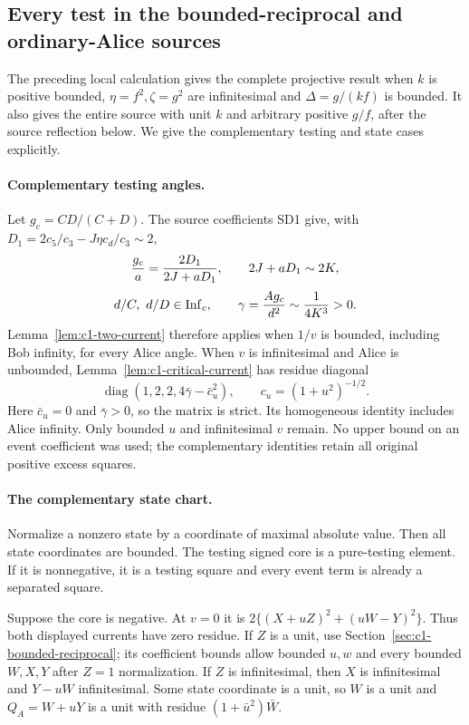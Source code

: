 \subsection{Every test in the bounded-reciprocal and ordinary-Alice sources}
\label{sec:c1-uniform-projective-join}
\label{component:p9f00f949fc8c}
\label{component:p64b054e815d0}
\label{component:p18a57c9c271d}
\label{component:p41b39e2f94e1}
\label{p41b39e2f94e1:thm:bounded-delta}
\label{p18a57c9c271d:thm:c1-ordinary-angle}

The preceding local calculation gives the complete projective result
when $k$ is positive bounded, $\eta=f^2,\zeta=g^2$ are infinitesimal
and $\Delta=g/(kf)$ is bounded. It also gives the entire source with
unit $k$ and arbitrary positive $g/f$, after the source reflection
below. We give the complementary testing and state cases explicitly.

\paragraph{Complementary testing angles.}
Let $g_c=CD/(C+D)$. The source coefficients SD1 give, with
$D_1=2c_5/c_3-J\eta c_d/c_3\sim2$,
\[
 {g_c\over a}={2D_1\over 2J+aD_1},\qquad
 2J+aD_1\sim2K,
\]
\[
 d/C,\ d/D\in\operatorname{Inf}_c,\qquad
 \gamma={Ag_c\over d^2}\sim{1\over4K^3}>0.
\]
Lemma~\ref{lem:c1-two-current} therefore applies when $1/v$ is bounded, including
Bob infinity, for every Alice angle. When $v$ is infinitesimal and
Alice is unbounded, Lemma~\ref{lem:c1-critical-current} has
residue diagonal
\[
 \operatorname{diag}(1,2,2,4\bar\gamma-\bar c_u^2),
 \qquad c_u=(1+u^2)^{-1/2}.
\]
Here $\bar c_u=0$ and $\bar\gamma>0$, so the matrix is strict.
Its homogeneous identity includes Alice infinity. Only bounded $u$
and infinitesimal $v$ remain. No upper bound on an event coefficient
was used; the complementary identities retain all original positive
excess squares.

\paragraph{The complementary state chart.}
Normalize a nonzero state by a coordinate of maximal absolute value.
Then all state coordinates are bounded. The testing signed core is a
pure-testing element. If it is nonnegative, it is a testing square
and every event term is already a separated square.

Suppose the core is negative. At $v=0$ it is
$2\{(X+uZ)^2+(uW-Y)^2\}$. Thus both displayed currents have zero
residue. If $Z$ is a unit, use
Section~\ref{sec:c1-bounded-reciprocal}; its coefficient bounds allow
bounded $u,w$ and every bounded $W,X,Y$ after $Z=1$ normalization.
If $Z$ is infinitesimal, then $X$ is infinitesimal and
$Y-uW$ infinitesimal. Some state coordinate is a unit, so $W$ is a
unit and $Q_A=W+uY$ is a unit with residue $(1+\bar u^2)\bar W$.

